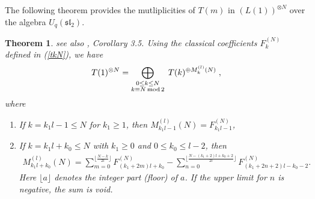 \documentclass[11pt]{amsart}
\newcommand\lie[1]{\mathfrak{#1}}
\newtheorem{theorem}{Theorem}[section]
\begin{document}
The following theorem provides the mutliplicities of $T(m)$ in $(L(1))^{\otimes N}$ over the algebra $U_q(\lie{sl}_2)$. 
\begin{theorem} see also \cite{And17}, Corollary 3.5. \label{comb_coef}
 Using the classical coefficients $F_k^{(N)}$ defined in (\ref{tkN}),  we have  
\[ T(1)^{\otimes N} =  \bigoplus_{\substack{0 \leq k \leq N\\ k \equiv N\,{\rm mod}\,{2}}}  \; T(k)^{\oplus M_{k}^{(l)}(N)}  \; , \] 
where
\begin{enumerate} 
\item If $k = k_1 l -1 \leq N$ for $k_1 \geq 1$,  then  $M_{k_1 l -1}^{(l)}(N) = F_{k_1l-1}^{(N)}$,  
\item  If  $k = k_1 l + k_0 \leq N$ with $k_1 \geq 0$ and $0 \leq k_0 \leq l-2$, then 
\begin{eqnarray}\label{p-numbers}
M_{k_1 l +k_0}^{(l)}(N) =   
 \sum\limits_{m=0}^{\lfloor\frac{N-k}{2l}\rfloor} F_{(k_1+2m)l + k_0}^{(N)}-  \sum\limits_{n=0}^{\lfloor\frac{N-(k_1+ 2)l +k_0+2}{2l}\rfloor} F_{(k_1+2n +2)l -k_0-2}^{(N)} .  \nonumber
\end{eqnarray}
Here $\lfloor a\rfloor$ denotes the integer part (floor) of $a$. If the upper limit for $n$ is negative, the sum is void.   
\end{enumerate} 
\end{theorem} 
\end{document}
